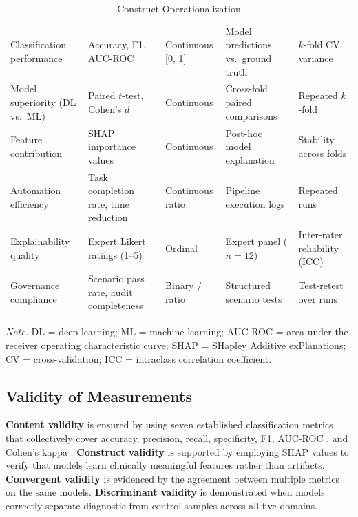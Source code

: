 \begin{table}[H]
\tablestripes
\small
\begin{tabularx}{\textwidth}{L L L L L}
\toprule
{} &  &  &  &  \\
\midrule
Classification performance & Accuracy, F1, AUC-ROC & Continuous [0, 1] & Model predictions vs.\ ground truth & $k$-fold CV variance \\
\addlinespace
Model superiority (DL vs.\ ML) & Paired $t$-test, Cohen's $d$ & Continuous & Cross-fold paired comparisons & Repeated $k$-fold \\
\addlinespace
Feature contribution & SHAP importance values & Continuous & Post-hoc model explanation & Stability across folds \\
\addlinespace
Automation efficiency & Task completion rate, time reduction & Continuous ratio & Pipeline execution logs & Repeated runs \\
\addlinespace
Explainability quality & Expert Likert ratings (1--5) & Ordinal & Expert panel ($n = 12$) & Inter-rater reliability (ICC) \\
\addlinespace
Governance compliance & Scenario pass rate, audit completeness & Binary / ratio & Structured scenario tests & Test-retest over runs \\
\bottomrule
\end{tabularx}
\caption{Construct Operationalization}
\label{tab:construct_operationalization}
\vspace{0.5em}\noindent\textit{Note.} DL = deep learning; ML = machine learning; AUC-ROC = area under the receiver operating characteristic curve; SHAP = SHapley Additive exPlanations; CV = cross-validation; ICC = intraclass correlation coefficient.
\end{table}

\subsection{Validity of Measurements}

\textbf{Content validity} is ensured by using seven established classification metrics that collectively cover accuracy, precision, recall, specificity, F1, AUC-ROC \citep{fawcett2006roc}, and Cohen's kappa \citep{cohen1960kappa}. \textbf{Construct validity} is supported by employing SHAP values to verify that models learn clinically meaningful features rather than artifacts. \textbf{Convergent validity} is evidenced by the agreement between multiple metrics on the same models. \textbf{Discriminant validity} is demonstrated when models correctly separate diagnostic from control samples across all five domains.

